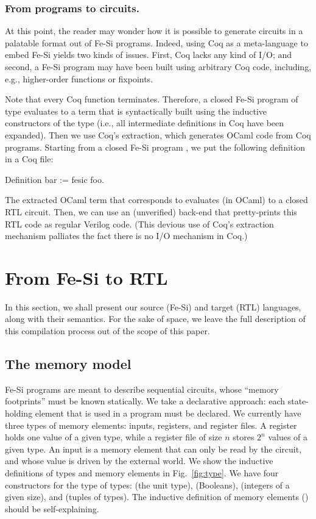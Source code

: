\documentclass{llncs}
\begin{document}
\subsubsection{From programs to circuits.} At this point, the reader
may wonder how it is possible to generate circuits in a palatable
format out of Fe-Si programs. Indeed, using Coq as a meta-language to
embed Fe-Si yields two kinds of issues. First, Coq lacks any kind of
I/O; and second, a Fe-Si program may have been built using arbitrary
Coq code, including, e.g., higher-order functions or fixpoints.

Note that every Coq function terminates. Therefore, a closed Fe-Si
program of type  evaluates to a term that is
syntactically built using the inductive constructors of the type
 (i.e., all intermediate definitions in Coq have been expanded).
%
Then we use Coq's extraction, which generates OCaml code from Coq
programs.  
%
Starting from a closed Fe-Si program , we put the following
definition in a Coq file:
\begin{mcoq}
Definition bar := fesic foo.  
\end{mcoq}
The extracted OCaml term that corresponds to  evaluates (in
OCaml) to a closed RTL circuit. Then, we can use an (unverified)
back-end that pretty-prints this RTL code as regular Verilog code.
%
(This devious use of Coq's extraction mechanism palliates the fact
there is no I/O mechanism in Coq.)

\section{From Fe-Si to RTL}

In this section, we shall present our source (Fe-Si) and target (RTL)
languages, along with their semantics. For the sake of space, we leave
the full description of this compilation process out of the scope of
this paper.

\subsection{The memory model}
Fe-Si programs are meant to describe sequential circuits, whose
``memory footprints'' must be known statically. We take a declarative
approach: each state-holding element that is used in a program must be
declared. 
%
We currently have three types of memory elements: inputs, registers,
and register files. A register holds one value of a given type, while a
register file of size $n$ stores $2^n$ values of a given type. 
%
An input is a memory element that can only be read by the circuit,
and whose value is driven by the external world.
%
We show the inductive definitions of types and memory elements in
Fig.~\ref{fig:type}. 
%
We have four constructors for the type  of types: 
(the unit type),  (Booleans),  (integers of a given
size), and  (tuples of types). The inductive definition of
memory elements () should be self-explaining. 
\end{document}
